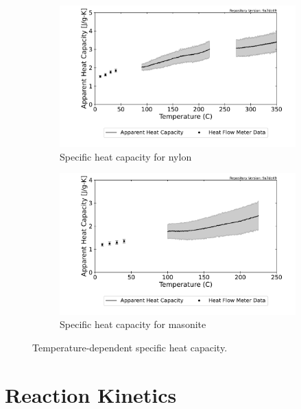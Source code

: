 \documentclass[12pt,oneside]{book}
\begin{document}
\begin{figure}[H]
    \centering
    \begin{subfigure}[b]{0.475\textwidth}
        \centering
        \includegraphics[width=\textwidth]{Figures/Nylon_10K_cp_interval_HFM.pdf}
        \caption{Specific heat capacity for nylon}
    \end{subfigure}
    \hfill
    \begin{subfigure}[b]{0.475\textwidth}
        \centering
        \includegraphics[width=\textwidth]{Figures/Masonite_Board_10K_cp_interval_HFM.pdf}
        \caption{Specific heat capacity for masonite}
    \end{subfigure}
    \caption[Temperature-Dependent Specific Heat Capacity] {Temperature-dependent specific heat capacity.} 
    \label{fig:cp_interval}
\end{figure}

\section{Reaction Kinetics}
\end{document}
